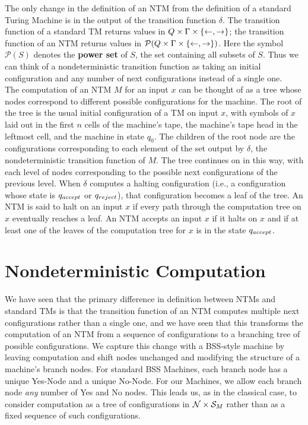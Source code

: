The only change in the definition of an NTM from the definition of a
standard Turing Machine is in the output of the transition function
$\delta$.  The transition function of a standard TM returns values in
$Q \times \Gamma \times \{\leftarrow, \rightarrow\}$; the transition
function of an NTM returns values in $\mathcal{P}(Q \times \Gamma \times
  \{\leftarrow, \rightarrow\})$.  Here the symbol $\mathcal{P}(S)$
denotes the \textbf{power set} of $S$, the set containing all subsets
of $S$.  Thus we can think of a nondeterministic transition function
as taking an initial configuration and any number of next
configurations instead of a single one.\\

The computation of an NTM $M$ for an input $x$ can be thought of as a
tree whose nodes correspond to different possible configurations for
the machine.  The root of the tree is the usual initial configuration
of a TM on input $x$, with symbols of $x$ laid out in the first $n$
cells of the machine's tape, the machine's tape head in the leftmost
cell, and the machine in state $q_0$.  The children of the root node
are the configurations corresponding to each element of the set output
by $\delta$, the nondeterministic transition function of $M$.  The
tree continues on in this way, with each level of nodes corresponding
to the possible next configurations of the previous level.  When
$\delta$ computes a halting configuration (i.e., a configuration whose
state is $q_{accept}$ or $q_{reject}$), that configuration becomes a leaf
of the tree.  An NTM is said to halt on an input $x$ if every path
through the computation tree on $x$ eventually reaches a leaf.  An NTM
accepts an input $x$ if it halts on $x$ and if at least one of the
leaves of the computation tree for $x$ is in the state $q_{accept}$.\\


\section{Nondeterministic Computation}

We have seen that the primary difference in definition between NTMs
and standard TMs is that the transition function of an NTM computes
multiple next configurations rather than a single one, and we have
seen that this transforms the computation of an NTM from a sequence of
configurations to a branching tree of possible configurations.  We
capture this change with a BSS-style machine by leaving computation
and shift nodes unchanged and modifying the structure of a machine's
branch nodes.  For standard BSS Machines, each branch node has a
unique Yes-Node and a unique No-Node.  For our \ndet Machines, we
allow each branch node \emph{any} number of Yes and No nodes.  This
leads us, as in the classical case, to consider computation as a tree
of configurations in $\mathcal{N} \times \mathcal{S}_M$ rather than as a
fixed sequence of such configurations.\\

